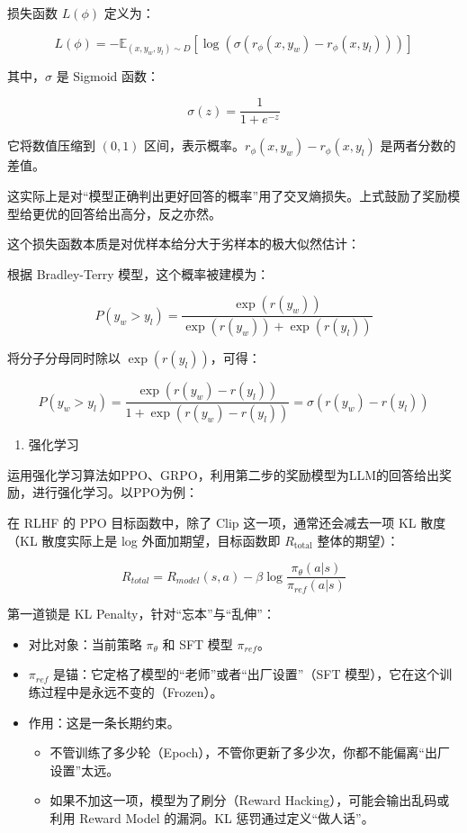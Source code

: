 损失函数 \(L(\phi)\) 定义为：

\[
L(\phi)=-\mathbb{E}_{(x,y_w,y_l)\sim D}\left[\log\left(\sigma\left(r_\phi(x,y_w)-r_\phi(x,y_l)\right)\right)\right]
\]

其中，\(\sigma\) 是 Sigmoid 函数：

\[
\sigma(z)=\frac{1}{1+e^{-z}}
\]

它将数值压缩到 \((0,1)\) 区间，表示概率。\(r_\phi(x,y_w)-r_\phi(x,y_l)\) 是两者分数的差值。

这实际上是对``模型正确判出更好回答的概率''用了交叉熵损失。上式鼓励了奖励模型给更优的回答给出高分，反之亦然。

这个损失函数本质是对优样本给分大于劣样本的极大似然估计：

根据 Bradley-Terry 模型，这个概率被建模为：

\[
P(y_w>y_l)=\frac{\exp(r(y_w))}{\exp(r(y_w))+\exp(r(y_l))}
\]

将分子分母同时除以 \(\exp(r(y_l))\)，可得：

\[
P(y_w>y_l)=\frac{\exp(r(y_w)-r(y_l))}{1+\exp(r(y_w)-r(y_l))}=\sigma(r(y_w)-r(y_l))
\]

\begin{enumerate}
\def\labelenumi{\arabic{enumi}.}
\setcounter{enumi}{1}
\tightlist
\item
  强化学习
\end{enumerate}

运用强化学习算法如PPO、GRPO，利用第二步的奖励模型为LLM的回答给出奖励，进行强化学习。以PPO为例：

在 RLHF 的 PPO 目标函数中，除了 Clip 这一项，通常还会减去一项 KL 散度（KL 散度实际上是 log 外面加期望，目标函数即 \(R_{\mathrm{total}}\) 整体的期望）：

\[
R_{total}=R_{model}(s,a)-\beta\log\frac{\pi_\theta(a|s)}{\pi_{ref}(a|s)}
\]

第一道锁是 KL Penalty，针对``忘本''与``乱伸''：

\begin{itemize}
\tightlist
\item
  对比对象：当前策略 \(\pi_\theta\) 和 SFT 模型 \(\pi_{ref}\)。
\item
  \(\pi_{ref}\) 是锚：它定格了模型的``老师''或者``出厂设置''（SFT 模型），它在这个训练过程中是永远不变的（Frozen）。
\item
  作用：这是一条长期约束。

  \begin{itemize}
  \tightlist
  \item
    不管训练了多少轮（Epoch），不管你更新了多少次，你都不能偏离``出厂设置''太远。
  \item
    如果不加这一项，模型为了刷分（Reward Hacking），可能会输出乱码或利用 Reward Model 的漏洞。KL 惩罚通过定义``做人话''。
  \end{itemize}
\end{itemize}

